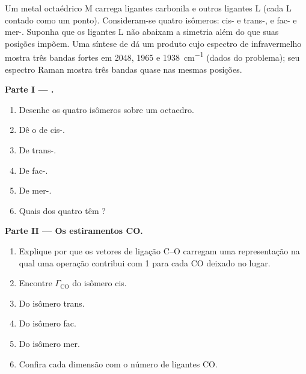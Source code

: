 \begin{problem}
\label{pb:b3:group-theory-applied:1}
Um metal octaédrico M carrega ligantes carbonila e outros ligantes L (cada L
contado como um ponto). Consideram-se quatro isômeros: cis- e
trans-, e fac- e mer-. Suponha que os ligantes L não
abaixam a simetria além do que suas posições impõem. Uma síntese de
 dá um produto cujo espectro de infravermelho mostra três bandas
fortes em 2048, 1965 e \qty{1938}{cm^{-1}} (dados do problema); seu espectro
Raman mostra três bandas quase nas mesmas posições.

\medskip\noindent\textbf{Parte I --- .}
\begin{enumerate}
  \item Desenhe os quatro isômeros sobre um octaedro.
  \item Dê o  de cis-.
  \item De trans-.
  \item De fac-.
  \item De mer-.
  \item Quais dos quatro têm ?
\end{enumerate}

\medskip\noindent\textbf{Parte II --- Os estiramentos CO.}
\begin{enumerate}[resume]
  \item Explique por que os vetores de ligação C--O carregam uma representação
        na qual uma operação contribui com 1 para cada CO deixado no lugar.
  \item Encontre $\Gamma_{\mathrm{CO}}$ do isômero cis.
  \item Do isômero trans.
  \item Do isômero fac.
  \item Do isômero mer.
  \item Confira cada dimensão com o número de ligantes CO.
\end{enumerate}


\end{problem}
